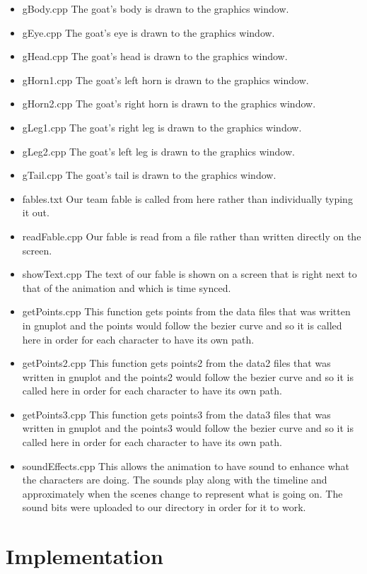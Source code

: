 \documentclass{article}
\begin{document}
\begin{itemize}
	\item gBody.cpp The goat's body is drawn to the graphics window.
	\item gEye.cpp The goat's eye is drawn to the graphics window.
	\item gHead.cpp The goat's head is drawn to the graphics window.
	\item gHorn1.cpp The goat's left horn is drawn to the graphics window.
	\item gHorn2.cpp The goat's right horn is drawn to the graphics window.
	\item gLeg1.cpp The goat's right leg is drawn to the graphics window.
	\item gLeg2.cpp The goat's left leg is drawn to the graphics window.
	\item gTail.cpp The goat's tail is drawn to the graphics window.
	\item fables.txt Our team fable is called from here rather than
	individually typing it out.
	\item readFable.cpp Our fable is read from a file rather than written
	directly on the screen.
	\item showText.cpp The text of our fable is shown on a screen that is 
	right next to that of the animation and which is time synced. 
	\item getPoints.cpp This function gets points from the data files 
	that was written in gnuplot and the points
	would follow the bezier curve and so it is called
	here in order for each character to have its
	own path.
	\item getPoints2.cpp This function gets points2 from the data2 files 
	that was written in gnuplot and the points2
	would follow the bezier curve and so it is called
	here in order for each character to have its
	own path.
	\item getPoints3.cpp This function gets points3 from the data3 files 
	that was written in gnuplot and the points3
	would follow the bezier curve and so it is called
	here in order for each character to have its
	own path.
	\item soundEffects.cpp This allows the animation to have 
	sound to enhance what the characters are 
	doing. The sounds play along with the
	timeline and approximately when the
	scenes change to represent what is going on.
	The sound bits were uploaded to our 
	directory in order for it to work.
	
         
         
\end{itemize}
\newpage\section{Implementation}
\end{document}
